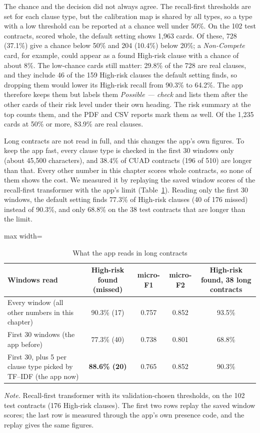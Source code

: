 The chance and the decision did not always agree. The recall-first thresholds are set for each clause type, but the calibration map is shared by all types, so a type with a low threshold can be reported at a chance well under 50\%. On the 102 test contracts, scored whole, the default setting shows 1{,}963 cards. Of these, 728 (37.1\%) give a chance below 50\% and 204 (10.4\%) below 20\%; a \emph{Non-Compete} card, for example, could appear as a found High-risk clause with a chance of about 8\%. The low-chance cards still matter: 29.8\% of the 728 are real clauses, and they include 46 of the 159 High-risk clauses the default setting finds, so dropping them would lower its High-risk recall from 90.3\% to 64.2\%. The app therefore keeps them but labels them \emph{Possible --- check} and lists them after the other cards of their risk level under their own heading. The risk summary at the top counts them, and the PDF and CSV reports mark them as well. Of the 1{,}235 cards at 50\% or more, 83.9\% are real clauses.

Long contracts are not read in full, and this changes the app's own figures. To keep the app fast, every clause type is checked in the first 30 windows only (about 45{,}500 characters), and 38.4\% of CUAD contracts (196 of 510) are longer than that. Every other number in this chapter scores whole contracts, so none of them shows the cost. We measured it by replaying the saved window scores of the recall-first transformer with the app's limit (Table~\ref{tab:windowcap}). Reading only the first 30 windows, the default setting finds 77.3\% of High-risk clauses (40 of 176 missed) instead of 90.3\%, and only 68.8\% on the 38 test contracts that are longer than the limit.

\begin{table}[!htbp]
\centering
\caption{What the app reads in long contracts}
\label{tab:windowcap}
\small
\begin{adjustbox}{max width=\textwidth}
\begin{tabular}{lcccc}
\toprule
\textbf{Windows read} & \textbf{High-risk found (missed)} & \textbf{micro-F1} & \textbf{micro-F2} & \textbf{High-risk found, 38 long contracts}\\
\midrule
Every window (all other numbers in this chapter) & 90.3\% (17) & 0.757 & 0.852 & 93.5\%\\
First 30 windows (the app before) & 77.3\% (40) & 0.738 & 0.801 & 68.8\%\\
First 30, plus 5 per clause type picked by TF--IDF (the app now) & \textbf{88.6\% (20)} & 0.765 & 0.852 & 90.3\%\\
\bottomrule
\end{tabular}
\end{adjustbox}

{\footnotesize\singlespacing \emph{Note.} Recall-first transformer with its validation-chosen thresholds, on the 102 test contracts (176 High-risk clauses). The first two rows replay the saved window scores; the last row is measured through the app's own presence code, and the replay gives the same figures.\par}
\end{table}

